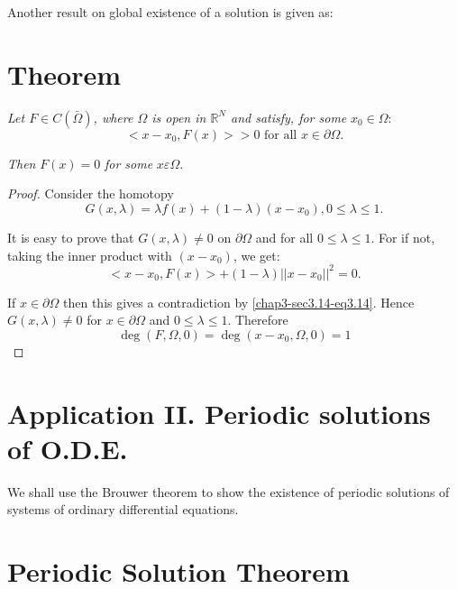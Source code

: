 Another result on global existence of a solution is given as:

\section{Theorem}\label{chap3-sec3.14}
{\em
  Let $ F \in C (\bar{\Omega})$, where $\Omega$
  is open in $\mathbb{R}^N$ and satisfy, for some}
  $x_0 \in\Omega$: 
 \begin{equation*}
< x- x_0, F(x) > > 0 \text{ for all } x \in \partial \Omega
. \tag{3.14} \label{chap3-sec3.14-eq3.14}
\end{equation*}

\textit{Then} $F(x) = 0$ \textit{for some} $x \varepsilon\Omega$.

\begin{proof}
Consider the homotopy  
$$
G(x, \lambda) = \lambda f(x) + (1 - \lambda) (x-x_0) , 0 \leq \lambda
\leq 1. 
$$

It is easy to prove that $G(x, \lambda) \neq 0$ on $\partial \Omega$
and for all $0 \leq \lambda \leq 1$. For if not, taking the inner
product with $(x-x_0)$, we get: 
$$
< x - x_0, F(x) > +  (1 - \lambda) || x-x_0 ||^2 = 0.
$$

\noindent
If $x \in \partial \Omega$ then this gives a contradiction by
\eqref{chap3-sec3.14-eq3.14}. Hence $G(x, \lambda) \neq 0$ for $ x \in
\partial \Omega$ 
and $0 \leq \lambda \leq 1$. Therefore  
$$
\deg (F , \Omega,0) = \deg (x-x_0 , \Omega,0) = 1
$$
\end{proof}


\section*{Application II. Periodic solutions of O.D.E.}

We shall use the Brouwer theorem to show the existence of periodic
solutions of systems of ordinary differential equations. 


\section{Periodic Solution Theorem}\pageoriginale\label{chap3-sec3.15}%

